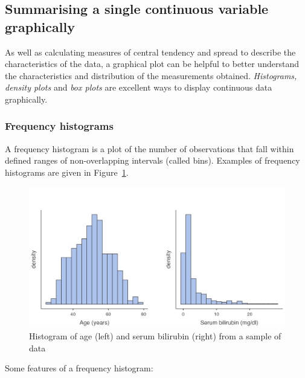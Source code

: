 \documentclass[
  a4paper,
]{memoir}
\begin{document}
\hypertarget{summarising-a-single-continuous-variable-graphically}{%
\subsection{Summarising a single continuous variable
graphically}\label{summarising-a-single-continuous-variable-graphically}}

As well as calculating measures of central tendency and spread to
describe the characteristics of the data, a graphical plot can be
helpful to better understand the characteristics and distribution of the
measurements obtained. \emph{Histograms, density plots} and \emph{box
plots} are excellent ways to display continuous data graphically.

\hypertarget{frequency-histograms}{%
\subsubsection{Frequency histograms}\label{frequency-histograms}}

A frequency histogram is a plot of the number of observations that fall
within defined ranges of non-overlapping intervals (called bins).
Examples of frequency histograms are given in Figure~\ref{fig-hist-1}.

\begin{figure}

{\centering \includegraphics[width=1\textwidth,height=\textheight]{img/mod01/hist-symmetric-skewed.png}

}

\caption{\label{fig-hist-1}Histogram of age (left) and serum bilirubin
(right) from a sample of data}

\end{figure}

Some features of a frequency histogram:
\end{document}
